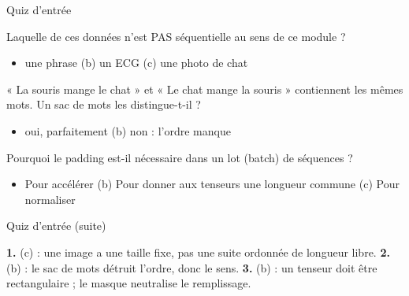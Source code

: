 \begin{frame}{Quiz d'entrée}
\begin{qbox}[Question 1]
Laquelle de ces données n'est PAS séquentielle au sens de ce module ?
\begin{itemize}
  \item[(a)] une phrase \quad (b) un ECG \quad (c) une photo de chat
\end{itemize}
\end{qbox}
\begin{qbox}[Question 2]
« La souris mange le chat » et « Le chat mange la souris » contiennent les
mêmes mots. Un sac de mots les distingue-t-il ?
\begin{itemize}
  \item[(a)] oui, parfaitement \quad (b) non : l'ordre manque
\end{itemize}
\end{qbox}
\begin{qbox}[Question 3]
Pourquoi le padding est-il nécessaire dans un lot (batch) de séquences ?
\begin{itemize}
  \item[(a)] Pour accélérer \quad (b) Pour donner aux tenseurs une longueur commune
  \quad (c) Pour normaliser
\end{itemize}
\end{qbox}

\end{frame}
\begin{frame}{Quiz d'entrée (suite)}
\begin{solbox}[Réponses]
\textbf{1.} (c) : une image a une taille fixe, pas une suite ordonnée de longueur libre. \quad
\textbf{2.} (b) : le sac de mots détruit l'ordre, donc le sens. \quad
\textbf{3.} (b) : un tenseur doit être rectangulaire ; le masque neutralise le remplissage.
\end{solbox}
\end{frame}
